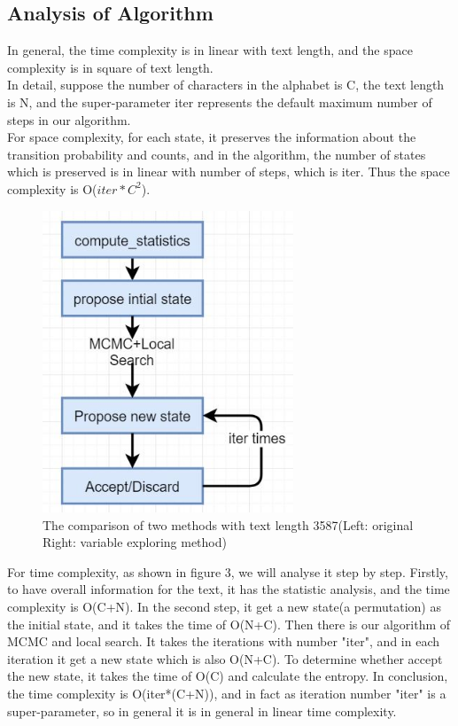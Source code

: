 \documentclass{acmtog} %
\begin{document}
\subsection{Analysis of Algorithm}
In general, the time complexity is in linear with text length, and the space complexity is in square of text length.\\
In detail, suppose the number of characters in the alphabet is C, the text length is N, and the super-parameter iter represents the default maximum number of steps in our algorithm.\\
For space complexity, for each state, it preserves the information about the transition probability and counts, and in the algorithm, the number of states which is preserved is in linear with number of steps, which is iter. Thus the space complexity is O($iter*C^2$).\\
\begin{figure}[htb]
\centerline{\includegraphics[width=7.5cm]{pic/process.jpg}}
\caption{The comparison of two methods with text length 3587(Left: original Right: variable exploring method)}
  \label{process}
\end{figure}
For time complexity, as shown in figure 3, we will analyse it step by step. Firstly, to have overall information for the text, it has the statistic analysis, and the time complexity is O(C+N). In the second step, it get a new state(a permutation) as the initial state, and it takes the time of O(N+C). Then there is our algorithm of MCMC and local search. It takes the iterations with number "iter", and in each iteration it get a new state which is also O(N+C). To determine whether accept the new state, it takes the time of O(C) and calculate the entropy. In conclusion, the time complexity is O(iter*(C+N)), and in fact as iteration number "iter" is a super-parameter, so in general it is in general in linear time complexity.
%
\end{document}
